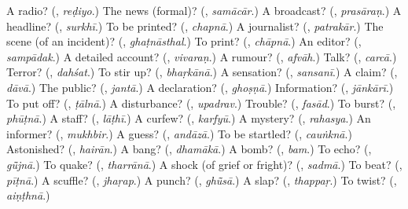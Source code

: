 \begin{tcolorbox}[breakable,colback=teal!4,colframe=teal!35!black,title={Before you move on}]
A radio? (\textbf{}, \emph{reḍiyo}.) The news (formal)? (\textbf{}, \emph{samācār}.) A broadcast? (\textbf{}, \emph{prasāraṇ}.) A headline? (\textbf{}, \emph{surkhī}.) To be printed? (\textbf{}, \emph{chapnā}.) A journalist? (\textbf{}, \emph{patrakār}.) The scene (of an incident)? (\textbf{}, \emph{ghaṭnāsthal}.) To print? (\textbf{}, \emph{chāpnā}.) An editor? (\textbf{}, \emph{sampādak}.) A detailed account? (\textbf{}, \emph{vivaraṇ}.) A rumour? (\textbf{}, \emph{afvāh}.) Talk? (\textbf{}, \emph{carcā}.) Terror? (\textbf{}, \emph{dahśat}.) To stir up? (\textbf{}, \emph{bhaṛkānā}.) A sensation? (\textbf{}, \emph{sansanī}.) A claim? (\textbf{}, \emph{dāvā}.) The public? (\textbf{}, \emph{jantā}.) A declaration? (\textbf{}, \emph{ghoṣṇā}.) Information? (\textbf{}, \emph{jānkārī}.) To put off? (\textbf{}, \emph{ṭālnā}.) A disturbance? (\textbf{}, \emph{upadrav}.) Trouble? (\textbf{}, \emph{fasād}.) To burst? (\textbf{}, \emph{phūṭnā}.) A staff? (\textbf{}, \emph{lāṭhī}.) A curfew? (\textbf{}, \emph{karfyū}.) A mystery? (\textbf{}, \emph{rahasya}.) An informer? (\textbf{}, \emph{mukhbir}.) A guess? (\textbf{}, \emph{andāzā}.) To be startled? (\textbf{}, \emph{cauṅknā}.) Astonished? (\textbf{}, \emph{hairān}.) A bang? (\textbf{}, \emph{dhamākā}.) A bomb? (\textbf{}, \emph{bam}.) To echo? (\textbf{}, \emph{gū̃jnā}.) To quake? (\textbf{}, \emph{tharrānā}.) A shock (of grief or fright)? (\textbf{}, \emph{sadmā}.) To beat? (\textbf{}, \emph{pīṭnā}.) A scuffle? (\textbf{}, \emph{jhaṛap}.) A punch? (\textbf{}, \emph{ghū̃sā}.) A slap? (\textbf{}, \emph{thappaṛ}.) To twist? (\textbf{}, \emph{aiṇṭhnā}.)
\end{tcolorbox}
